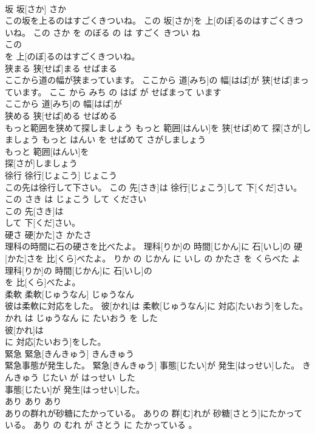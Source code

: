 \documentclass[8pt]{extreport}
\begin{document}
\begin{CJK}{UTF8}{min}
\\	坂	坂[さか]	さか	
\\	この坂を上るのはすごくきついね。	この 坂[さか]を 上[のぼ]るのはすごくきついね。	この さか を のぼる の は すごく きつい ね	
\\	この
\\	を 上[のぼ]るのはすごくきついね。			
\\	狭まる	狭[せば]まる	せばまる	
\\	ここから道の幅が狭まっています。	ここから 道[みち]の 幅[はば]が 狭[せば]まっています。	ここ から みち の はば が せばまって います	
\\	ここから 道[みち]の 幅[はば]が
\\	狭める	狭[せば]める	せばめる	
\\	もっと範囲を狭めて探しましょう	もっと 範囲[はんい]を 狭[せば]めて 探[さが]しましょう	もっと はんい を せばめて さがしましょう	
\\	もっと 範囲[はんい]を
\\	探[さが]しましょう			
\\	徐行	徐行[じょこう]	じょこう	
\\	この先は徐行して下さい。	この 先[さき]は 徐行[じょこう]して 下[くだ]さい。	この さき は じょこう して ください	
\\	この 先[さき]は
\\	して 下[くだ]さい。			
\\	硬さ	硬[かた]さ	かたさ	
\\	理科の時間に石の硬さを比べたよ。	理科[りか]の 時間[じかん]に 石[いし]の 硬[かた]さを 比[くら]べたよ。	りか の じかん に いし の かたさ を くらべた よ	
\\	理科[りか]の 時間[じかん]に 石[いし]の
\\	を 比[くら]べたよ。			
\\	柔軟	柔軟[じゅうなん]	じゅうなん	
\\	彼は柔軟に対応をした。	彼[かれ]は 柔軟[じゅうなん]に 対応[たいおう]をした。	かれ は じゅうなん に たいおう を した	
\\	彼[かれ]は
\\	に 対応[たいおう]をした。			
\\	緊急	緊急[きんきゅう]	きんきゅう	
\\	緊急事態が発生した。	緊急[きんきゅう] 事態[じたい]が 発生[はっせい]した。	きんきゅう じたい が はっせい した	
\\	事態[じたい]が 発生[はっせい]した。			
\\	あり	あり	あり	
\\	ありの群れが砂糖にたかっている。	ありの 群[む]れが 砂糖[さとう]にたかっている。	あり の むれ が さとう に たかっている 。	

\end{CJK}
\end{document}
